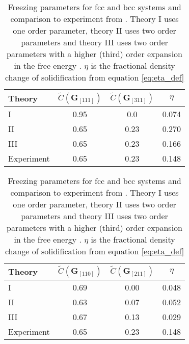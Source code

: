 \begin{table}[H]
    \begin{subtable}{0.4\linewidth}
        \centering
        \begin{tabular}{l c c c}
            \hline 
            Theory & $\tilde{C}(\mathbf{G}_{[111]})$ & $\tilde{C}(\mathbf{G}_{[311]})$ & $\eta$ \\ 
            \hline
            I & 0.95 & 0.0 & 0.074 \\
            II & 0.65 & 0.23 & 0.270 \\
            III & 0.65 & 0.23 & 0.166 \\
            Experiment & 0.65 & 0.23 & 0.148\\
            \hline
        \end{tabular}
        \caption[Freezing parameters for Argon]{Freezing parameters for fcc with
            comparison to Argon experimental results.
        }\label{table:ramakrishnan_argon}
    \end{subtable}
    \hspace{0.10\linewidth}
    \begin{subtable}{0.4\linewidth}
        \centering
        \begin{tabular}{l c c c}
            \hline 
            Theory & $\tilde{C}(\mathbf{G}_{[110]})$ & $\tilde{C}(\mathbf{G}_{[211]})$ & $\eta$ \\ 
            \hline
            I           & 0.69 & 0.00 & 0.048 \\
            II          & 0.63 & 0.07 & 0.052 \\
            III         & 0.67 & 0.13 & 0.029 \\
            Experiment  & 0.65 & 0.23 & 0.148\\
            \hline
        \end{tabular}
        \caption[Freezing parameters for Sodium]{Freezing parameters for bcc with 
            comparison to Sodium experimental results.
        }\label{table:ramakrishnan_sodium}
    \end{subtable}
    \caption[Table of Ramakrishnan results]{Freezing parameters for fcc and
        bcc systems and comparison to experiment from \cite{RAMAKRISHNAN79}.
        Theory I uses one order parameter, theory II uses two order parameters
        and theory III uses two order parameters with a higher (third) order
        expansion in the free energy . $\eta$ is the fractional density change of
        solidification from equation \ref{eq:eta_def}
    }
\end{table}

